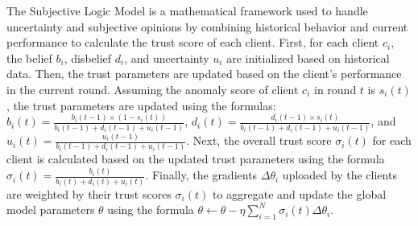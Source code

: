 \documentclass[conference]{IEEEtran}
\begin{document}







The Subjective Logic Model is a mathematical framework used to handle uncertainty and subjective opinions by combining historical behavior and current performance to calculate the trust score of each client. First, for each client $c_i$, the belief $b_i$, disbelief $d_i$, and uncertainty $u_i$ are initialized based on historical data. Then, the trust parameters are updated based on the client's performance in the current round. Assuming the anomaly score of client $c_i$ in round $t$ is $s_i(t)$, the trust parameters are updated using the formulas: $b_i(t) = \frac{b_i(t-1) \times (1 - s_i(t))}{b_i(t-1) + d_i(t-1) + u_i(t-1)}$, $d_i(t) = \frac{d_i(t-1) \times s_i(t)}{b_i(t-1) + d_i(t-1) + u_i(t-1)}$, and $u_i(t) = \frac{u_i(t-1)}{b_i(t-1) + d_i(t-1) + u_i(t-1)}$. Next, the overall trust score $\sigma_i(t)$ for each client is calculated based on the updated trust parameters using the formula $\sigma_i(t) = \frac{b_i(t)}{b_i(t) + d_i(t) + u_i(t)}$. Finally, the gradients $\Delta \theta_i$ uploaded by the clients are weighted by their trust scores $\sigma_i(t)$ to aggregate and update the global model parameters $\theta$ using the formula $\theta \leftarrow \theta - \eta \sum_{i=1}^N \sigma_i(t) \Delta \theta_i$.
\end{document}
